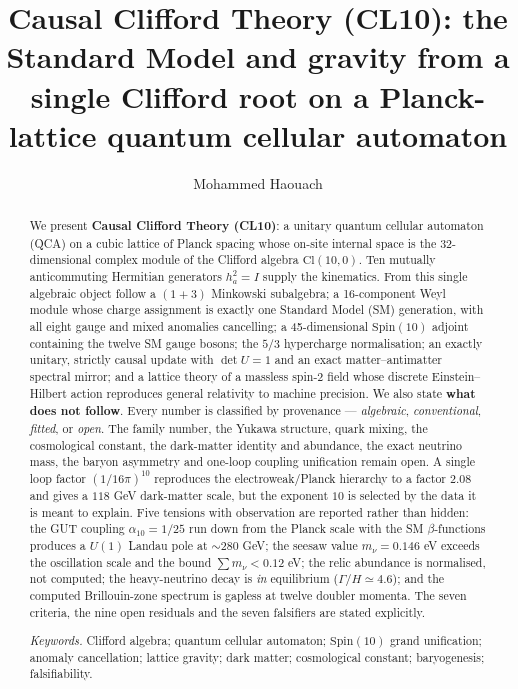 \documentclass[aps,prd,amsmath,amssymb,superscriptaddress,longbibliography,floatfix,preprint]{revtex4-2}
\begin{document}
\title{Causal Clifford Theory (CL10): the Standard Model and gravity from a single Clifford root on a Planck-lattice quantum cellular automaton}
\author{Mohammed Haouach}

\begin{abstract}
We present \textbf{Causal Clifford Theory (CL10)}: a unitary quantum cellular automaton (QCA) on a cubic lattice of Planck spacing whose on-site internal space is the 32-dimensional complex module of the Clifford algebra $\mathrm{Cl}(10,\allowbreak{}0)$. Ten mutually anticommuting Hermitian generators $h_a^2 = I$ supply the kinematics. From this single algebraic object follow a $(1{+}3)$ Minkowski subalgebra; a 16-component Weyl module whose charge assignment is exactly one Standard Model (SM) generation, with all eight gauge and mixed anomalies cancelling; a 45-dimensional $\mathrm{Spin}(10)$ adjoint containing the twelve SM gauge bosons; the $5/3$ hypercharge normalisation; an exactly unitary, strictly causal update with $\det U = 1$ and an exact matter--antimatter spectral mirror; and a lattice theory of a massless spin-2 field whose discrete Einstein--Hilbert action reproduces general relativity to machine precision. We also state \textbf{what does not follow}. Every number is classified by provenance --- \emph{algebraic}, \emph{conventional}, \emph{fitted}, or \emph{open}. The family number, the Yukawa structure, quark mixing, the cosmological constant, the dark-matter identity and abundance, the exact neutrino mass, the baryon asymmetry and one-loop coupling unification remain open. A single loop factor $(1/16\pi)^{10}$ reproduces the electroweak/Planck hierarchy to a factor $2.08$ and gives a $118$ GeV dark-matter scale, but the exponent $10$ is selected by the data it is meant to explain. Five tensions with observation are reported rather than hidden: the GUT coupling $\alpha_{10} = 1/25$ run down from the Planck scale with the SM $\beta$-functions produces a $U(1)$ Landau pole at $\sim 280$ GeV; the seesaw value $m_\nu = 0.146$ eV exceeds the oscillation scale and the bound $\sum m_\nu < 0.12$ eV; the relic abundance is normalised, not computed; the heavy-neutrino decay is \emph{in} equilibrium ($\Gamma/H \simeq 4.6$); and the computed Brillouin-zone spectrum is gapless at twelve doubler momenta. The seven criteria, the nine open residuals and the seven falsifiers are stated explicitly.

\medskip
\emph{Keywords.} Clifford algebra; quantum cellular automaton; $\mathrm{Spin}(10)$ grand unification; anomaly cancellation; lattice gravity; dark matter; cosmological constant; baryogenesis; falsifiability.
\end{abstract}
\end{document}
